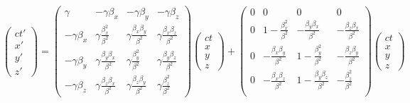 \documentclass[12pt]{article}
\begin{document}
        \begin{equation*}
            \begin{pmatrix}
                ct'\\
                x'\\
                y'\\
                z'
            \end{pmatrix} = \begin{pmatrix}
                \gamma & -\gamma\beta_x&-\gamma\beta_y&-\gamma\beta_z\\
                -\gamma\beta_x&\gamma\frac{\beta_x^2}{\beta^2}&\gamma\frac{\beta_x\beta_y}{\beta^2}&\gamma\frac{\beta_x\beta_z}{\beta^2}\\
                -\gamma\beta_y&\gamma\frac{\beta_y\beta_x}{\beta^2}&\gamma\frac{\beta_y^2}{\beta^2}&\gamma\frac{\beta_y\beta_z}{\beta^2}\\
                -\gamma\beta_z&\gamma\frac{\beta_z\beta_x}{\beta^2}&\gamma\frac{\beta_z\beta_y}{\beta^2}&\gamma\frac{\beta_z^2}{\beta^2}
            \end{pmatrix}\begin{pmatrix}
                ct\\
                x\\
                y\\
                z
            \end{pmatrix} +\begin{pmatrix}
                0&0&0&0\\
                0&1 - \frac{\beta_x^2}{\beta^2}&-\frac{\beta_y\beta_x}{\beta^2}&- \frac{\beta_z\beta_x}{\beta^2}\\
                0&-\frac{\beta_x\beta_y}{\beta^2}&1-\frac{\beta_y^2}{\beta^2}&- \frac{\beta_z\beta_y}{\beta^2}\\
                0&-\frac{\beta_x\beta_z}{\beta^2}&1-\frac{\beta_y\beta_z}{\beta^2}&- \frac{\beta_z^2}{\beta^2}\\
            \end{pmatrix} \begin{pmatrix}
                ct\\
                x\\
                y\\
                z
            \end{pmatrix}
        \end{equation*}
\end{document}
